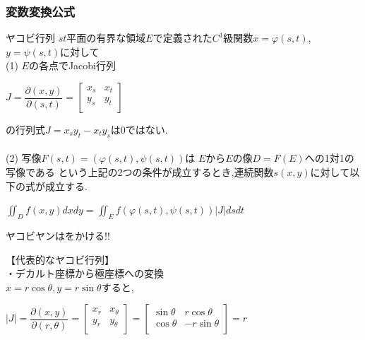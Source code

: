 \documentclass[a4paper]{jsarticle}
\begin{document}
\subsubsection{変数変換公式}
\begin{itembox}[l]{ヤコビ行列}
    $st$平面の有界な領域$E$で定義された$C^1$級関数$x=\varphi\left(s,t\right)$,$y=\psi\left(s,t\right)$に対して\\
    (1) $E$の各点でJacobi行列
    \begin{center}
        $J=\dfrac{\partial\left(x,y\right)}{\partial\left(s,t\right)}=\begin{bmatrix}
                x_s & x_t \\
                y_s & y_t \\
            \end{bmatrix}
        $
    \end{center}
    の行列式$J=x_sy_t-x_ty_s$は$0$ではない.\\\\
    (2) 写像$F\left(s,t\right)=\left(\varphi\left(s,t\right),\psi\left(s,t\right)\right)$は
    $E$から$E$の像$D=F\left(E\right)$への1対1の写像である
    という上記の2つの条件が成立するとき,連続関数$s\left(x,y\right)$に対して以下の式が成立する.\\
    \begin{center}
        $\displaystyle\iint_Df\left(x,y\right)dxdy=\iint_Ef\left(\varphi\left(s,t\right),\psi\left(s,t\right)\right)|J|dsdt$
    \end{center}
    ヤコビヤンはをかける!!
\end{itembox}
【代表的なヤコビ行列】\\
・デカルト座標から極座標への変換\\
$x=r\cos\theta,y=r\sin\theta$すると,\\
\begin{center}
    $|J|=\dfrac{\partial\left(x,y\right)}{\partial\left(r,\theta\right)}=
        \begin{bmatrix}
            x_r & x_\theta \\
            y_r & y_\theta \\
        \end{bmatrix}
        =
        \begin{bmatrix}
            \sin\theta & r\cos\theta  \\
            \cos\theta & -r\sin\theta \\
        \end{bmatrix}
        =r
    $
\end{center}
\newpage
\end{document}
